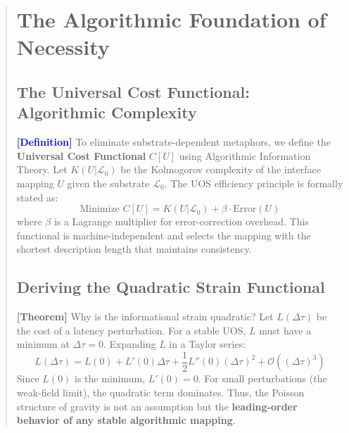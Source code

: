 \documentclass[11pt,titlepage]{article}
\newcommand{\substrate}{\mathcal{L}_0}
\newcommand{\protocol}{\mathcal{L}_1}
\newcommand{\logic}{\mathcal{L}_2}
\newcommand{\interface}{\mathcal{L}_3}
\newcommand{\tagdef}{\textcolor{blue}{\textbf{[Definition]}} }
\newcommand{\tagtheo}{\textcolor{green!60!black}{\textbf{[Theorem]}} }
\begin{document}
\begin{abstract}
\begin{center}
\end{center}

\section{The Algorithmic Foundation of Necessity}

\subsection{The Universal Cost Functional: Algorithmic Complexity}
\tagdef To eliminate substrate-dependent metaphors, we define the \textbf{Universal Cost Functional} $C[U]$ using Algorithmic Information Theory. Let $K(U | \substrate)$ be the Kolmogorov complexity of the interface mapping $U$ given the substrate $\substrate$. The UOS efficiency principle is formally stated as:
\begin{equation}
\text{Minimize } C[U] = K(U | \substrate) + \beta \cdot \text{Error}(U)
\end{equation}
where $\beta$ is a Lagrange multiplier for error-correction overhead. This functional is machine-independent and selects the mapping with the shortest description length that maintains consistency.

\subsection{Deriving the Quadratic Strain Functional}
\tagtheo Why is the informational strain quadratic? Let $L(\Delta \tau)$ be the cost of a latency perturbation. For a stable UOS, $L$ must have a minimum at $\Delta \tau = 0$. Expanding $L$ in a Taylor series:
\begin{equation}
L(\Delta \tau) = L(0) + L'(0)\Delta \tau + \frac{1}{2}L''(0)(\Delta \tau)^2 + \mathcal{O}((\Delta \tau)^3)
\end{equation}
Since $L(0)$ is the minimum, $L'(0)=0$. For small perturbations (the weak-field limit), the quadratic term dominates. Thus, the Poisson structure of gravity is not an assumption but the \textbf{leading-order behavior of any stable algorithmic mapping}.


\end{abstract}
\end{document}

